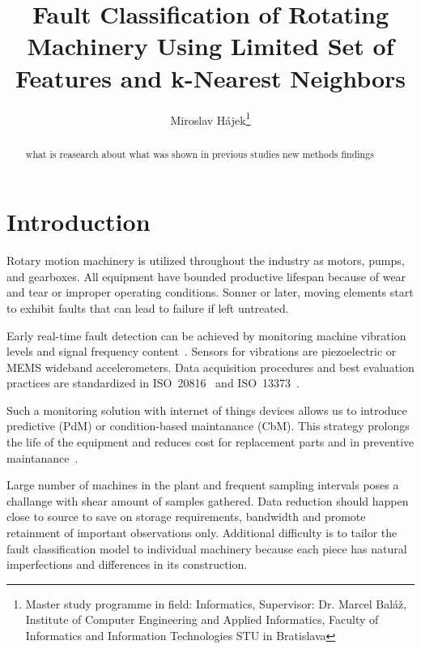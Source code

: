 \documentclass{llncs}
\begin{document}
\title{Fault Classification of Rotating Machinery Using Limited Set of Features and k-Nearest Neighbors}

\author{
	Miroslav Hájek\thanks{Master study programme in field: Informatics,
	Supervisor: Dr. Marcel Baláž, Institute of Computer Engineering and Applied Informatics, Faculty of Informatics and Information Technologies STU in Bratislava}
}


\maketitle

\begin{abstract}
what is reasearch about
what was shown in previous studies
new methods
findings

\end{abstract}


\section{Introduction}
Rotary motion machinery is utilized throughout the industry as motors, pumps, and gearboxes. All equipment have bounded productive lifespan because of wear and tear or improper operating conditions. Sonner or later, moving elements start to exhibit faults that can lead to failure if left untreated. 

Early real-time fault detection can be achieved by monitoring machine vibration levels and signal frequency content~\cite{ziaran_technicka_2013}. Sensors for vibrations are piezoelectric or MEMS wideband accelerometers. Data acquisition procedures and best evaluation practices are standardized in ISO~20816~\cite{noauthor_iso_2016} and ISO~13373~\cite{noauthor_iso_2002}. 

Such a monitoring solution with internet of things devices allows us to introduce predictive (PdM) or condition-based maintanance (CbM). This strategy prolongs the life of the equipment and reduces cost for replacement parts and in preventive maintanance~\cite{ziaran_technicka_2013}. 

Large number of machines in the plant and frequent sampling intervals poses a challange with shear amount of samples gathered. Data reduction should happen close to source to save on storage requirements, bandwidth and promote retainment of important observations only. Additional difficulty is to tailor the fault classification model to individual machinery because each piece has natural imperfections and differences in its construction. 
\end{document}
